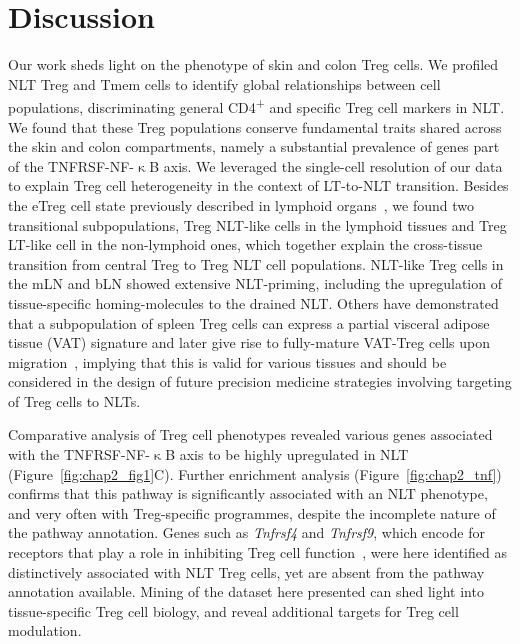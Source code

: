 \section{Discussion}
\label{section2.3}
Our work sheds light on the phenotype of skin and colon Treg cells. We profiled NLT Treg and Tmem cells to identify global relationships between cell populations, discriminating general CD4\textsuperscript{+} and specific Treg cell markers in NLT. We found that these Treg populations conserve fundamental traits shared across the skin and colon compartments, namely a substantial prevalence of genes part of the TNFRSF-NF-${\upkappa}$B axis.
We leveraged the single-cell resolution of our data to explain Treg cell heterogeneity in the context of LT-to-NLT transition. Besides the eTreg cell state previously described in lymphoid organs~\citep{Cretney2011-zd}, we found two transitional subpopulations, Treg NLT-like cells in the lymphoid tissues and Treg LT-like cell in the non-lymphoid ones, which together explain the cross-tissue transition from central Treg to Treg NLT cell populations. NLT-like Treg cells in the mLN and bLN showed extensive NLT-priming, including the upregulation of tissue-specific homing-molecules to the drained NLT. Others have demonstrated that a subpopulation of spleen Treg cells can express a partial visceral adipose tissue (VAT) signature and later give rise to fully-mature VAT-Treg cells upon migration~\citep{Li2018-xq}, implying that this is valid for various tissues and should be considered in the design of future precision medicine strategies involving targeting of Treg cells to NLTs.

Comparative analysis of Treg cell phenotypes revealed various genes associated with the TNFRSF-NF-${\upkappa}$B axis to be highly upregulated in NLT (Figure~\ref{fig:chap2_fig1}C). Further enrichment analysis (Figure~\ref{fig:chap2_tnf}) confirms that this pathway is significantly associated with an NLT phenotype, and very often with Treg-specific programmes, despite the incomplete nature of the pathway annotation. Genes such as \textit{Tnfrsf4} and \textit{Tnfrsf9}, which encode for receptors that play a role in inhibiting Treg cell function~\citep{nagar_tnf_2010}, were here identified as distinctively associated with NLT Treg cells, yet are absent from the pathway annotation available. Mining of the dataset here presented can shed light into tissue-specific Treg cell biology, and reveal additional targets for Treg cell modulation.

